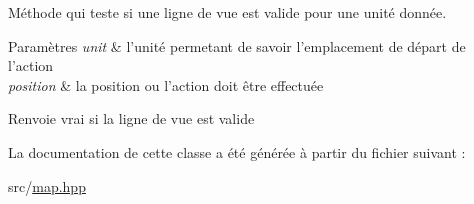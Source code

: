 Méthode qui teste si une ligne de vue est valide pour une unité donnée. 


\begin{DoxyParams}{Paramètres}
{\em unit} & l'unité permetant de savoir l'emplacement de départ de l'action \\
\hline
{\em position} & la position ou l'action doit être effectuée \\
\hline
\end{DoxyParams}
\begin{DoxyReturn}{Renvoie}
vrai si la ligne de vue est valide 
\end{DoxyReturn}


La documentation de cette classe a été générée à partir du fichier suivant \+:\begin{DoxyCompactItemize}
\item 
src/\hyperlink{map_8hpp}{map.\+hpp}\end{DoxyCompactItemize}
